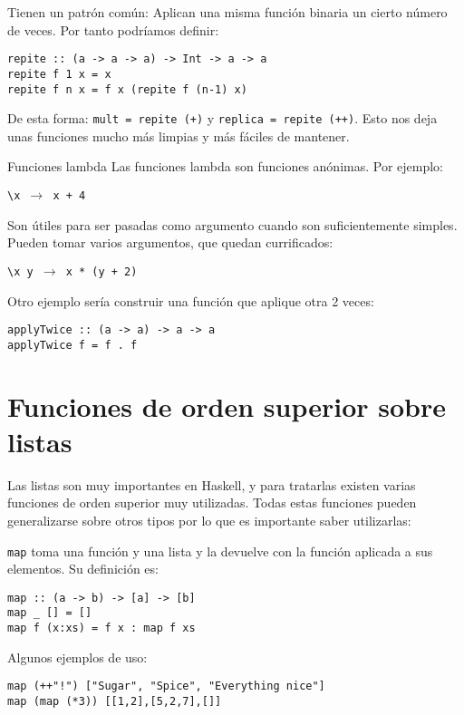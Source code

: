 Tienen un patrón común: Aplican una misma función binaria un cierto número de
veces. Por tanto podríamos definir:

\begin{lstlisting}
repite :: (a -> a -> a) -> Int -> a -> a
repite f 1 x = x
repite f n x = f x (repite f (n-1) x)
\end{lstlisting}

De esta forma:
\texttt{mult = repite (+)} y \texttt{replica = repite (++)}.
Esto nos deja unas funciones mucho más limpias y más fáciles de mantener.

\begin{extra}{Funciones lambda}
Las funciones lambda son funciones anónimas. Por ejemplo:

\espacio

\texttt{\textbackslash x $\to$  x + 4}

\espacio

Son útiles para ser pasadas como argumento cuando son suficientemente simples.
Pueden tomar varios argumentos, que quedan currificados:

\espacio

\texttt{\textbackslash x y $\to$ x * (y + 2)}

\end{extra}

Otro ejemplo sería construir una función que aplique otra 2 veces:

\begin{lstlisting}
applyTwice :: (a -> a) -> a -> a
applyTwice f = f . f
\end{lstlisting}

\section{Funciones de orden superior sobre listas}
Las listas son muy importantes en Haskell, y para tratarlas existen varias
funciones de orden superior muy utilizadas. Todas estas funciones pueden
generalizarse sobre otros tipos por lo que es importante saber utilizarlas:

\texttt{map} toma una función y una lista y la devuelve con la función aplicada
a sus elementos. Su definición es:
\begin{lstlisting}
map :: (a -> b) -> [a] -> [b]
map _ [] = []
map f (x:xs) = f x : map f xs
\end{lstlisting}

Algunos ejemplos de uso:
\begin{lstlisting}
map (++"!") ["Sugar", "Spice", "Everything nice"]
map (map (*3)) [[1,2],[5,2,7],[]]
\end{lstlisting}


